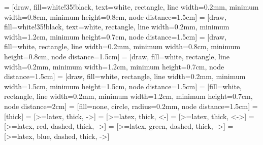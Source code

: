  = [draw, fill=white!35!black, text=white, rectangle, line width=0.2mm, minimum width=0.8cm, minimum height=0.8cm, node distance=1.5cm]
 = [draw, fill=white!35!black, text=white, rectangle, line width=0.2mm, minimum width=1.2cm, minimum height=0.7cm, node distance=1.5cm]
 = [draw, fill=white, rectangle, line width=0.2mm, minimum width=0.8cm, minimum height=0.8cm, node distance=1.5cm]
 = [draw, fill=white, rectangle, line width=0.2mm, minimum width=1.2cm, minimum height=0.7cm, node distance=1.5cm]
 = [draw, fill=white, rectangle, line width=0.2mm, minimum width=1.5cm, minimum height=1.5cm, node distance=1.5cm]
 = [fill=white, rectangle, line width=0.2mm, minimum width=1.2cm, minimum height=0.7cm, node distance=2cm]
 = [fill=none, circle, radius=0.2mm, node distance=1.5cm]
 =  [thick]
 = [>=latex, thick, ->]
 = [>=latex, thick, <-]
 = [>=latex, thick, <->]
 = [>=latex, red, dashed, thick, ->]
 = [>=latex, green, dashed, thick, ->]
 = [>=latex, blue, dashed, thick, ->]

